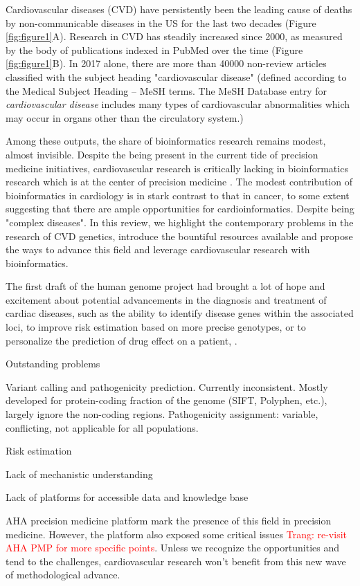 \documentclass[letter]{bioinfo}
\newcommand{\comment}[1]{\textcolor{red}{#1}}
\begin{document}
Cardiovascular diseases (CVD) have persistently been the leading cause of deaths by non-communicable diseases in the US for the last two decades (Figure \ref{fig:figure1}A). Research in CVD has steadily increased since 2000, as measured by the body of publications indexed in PubMed over the time (Figure \ref{fig:figure1}B). In 2017 alone, there are more than 40000 non-review articles classified with the subject heading "cardiovascular disease" (defined according to the Medical Subject Heading -- MeSH terms. The MeSH Database entry for \textit{cardiovascular disease} includes many types of cardiovascular abnormalities which may occur in organs other than the circulatory system.)

Among these outputs, the share of bioinformatics research remains modest, almost invisible. Despite the being present in the current tide of precision medicine initiatives, cardiovascular research is critically lacking in bioinformatics research which is at the center of precision medicine \citep{Gomez-Lopez:2017:Precision}.  The modest contribution of bioinformatics in cardiology is in stark contrast to that in cancer, to some extent suggesting that there are ample opportunities for cardioinformatics. Despite being "complex diseases". In this review, we highlight the contemporary problems in the research of CVD genetics, introduce the bountiful resources available and propose the ways to advance this field and leverage cardiovascular research with bioinformatics.

The first draft of the human genome project had brought a lot of hope and excitement about potential advancements in the diagnosis and treatment of cardiac diseases, such as the ability to identify disease genes within the associated loci, to improve risk estimation based on more precise genotypes, or to personalize the prediction of drug effect on a patient, \citep{Komajda:2001:heart}.


Outstanding problems

Variant calling and pathogenicity prediction. Currently inconsistent. Mostly developed for protein-coding fraction of the genome (SIFT, Polyphen, etc.), largely ignore the non-coding regions.
Pathogenicity assignment: variable, conflicting, not applicable for all populations.

Risk estimation

Lack of mechanistic understanding

Lack of platforms for accessible data and knowledge base

AHA precision medicine platform mark the presence of this field in precision medicine. However, the platform also exposed some critical issues \comment{Trang: re-visit AHA PMP for more specific points}. Unless we recognize the opportunities and tend to the challenges, cardiovascular research won't benefit from this new wave of methodological advance.
\end{document}
